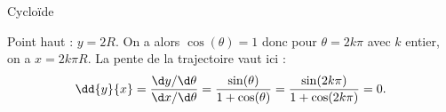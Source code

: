 \begin{exo}[PC][2][TD]{Cycloïde}
\begin{quest}
{\begin{liste}
    \item { Point haut : $y=2 R$. On a alors $\cos (\theta)=1$ donc pour $\theta = 2 k \pi$ avec $k$ entier, on a $x=2 k \pi R$. La pente de la trajectoire vaut ici :
    $$
    \dd{y}{x} = \frac{\d y/\d \theta}{\d x /\d \theta}  = \frac{\sin(\theta)}{1+\cos(\theta)} = \frac{\sin(2 k \pi)}{1+\cos(2 k \pi)} = 0.
    $$
    }

  \end{liste}


}


\end{quest}
\end{exo}
